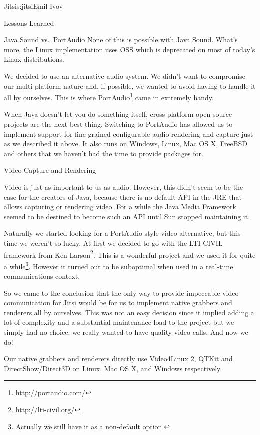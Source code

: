 \begin{aosachapter}{Jitsi}{s:jitsi}{Emil Ivov}
\begin{aosasect1}{Lessons Learned}
\begin{aosasect2}{Java Sound vs.\ PortAudio}
None of this is possible with Java Sound. What's more, the Linux
implementation uses OSS which is deprecated on most of today's Linux
distributions.

We decided to use an alternative audio system. We didn't want to
compromise our multi-platform nature and, if possible, we wanted to
avoid having to handle it all by ourselves. This is where 
PortAudio\footnote{\url{http://portaudio.com/}} came in extremely handy.

When Java doesn't let you do something itself, cross-platform open
source projects are the next best thing. Switching to PortAudio has
allowed us to implement support for fine-grained configurable audio
rendering and capture just as we described it above. It also runs on
Windows, Linux, Mac OS X, FreeBSD and others that we haven't had the
time to provide packages for.

\end{aosasect2}

\begin{aosasect2}{Video Capture and Rendering}

Video is just as important to us as audio. However, this didn't seem
to be the case for the creators of Java, because there is no default
API in the JRE that allows capturing or rendering video. For a while
the Java Media Framework seemed to be destined to become such an API
until Sun stopped maintaining it.

Naturally we started looking for a PortAudio-style video alternative,
but this time we weren't so lucky. At first we decided to go with the
LTI-CIVIL framework from Ken
Larson\footnote{\url{http://lti-civil.org/}}. This is a wonderful
project and we used it for quite a while\footnote{Actually we still have it as
a non-default option.}. However it turned out to be suboptimal
when used in a real-time communications context.

So we came to the conclusion that the only way to provide impeccable
video communication for Jitsi would be for us to implement native
grabbers and renderers all by ourselves. This was not an easy decision
since it implied adding a lot of complexity and a substantial
maintenance load to the project but we simply had no choice: we really
wanted to have quality video calls. And now we do!

Our native grabbers and renderers directly use Video4Linux 2, QTKit
and DirectShow/Direct3D on Linux, Mac OS X, and Windows respectively.

\end{aosasect2}


\end{aosasect1}
\end{aosachapter}
